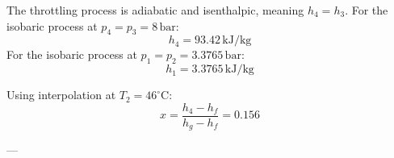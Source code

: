The throttling process is adiabatic and isenthalpic, meaning \( h_4 = h_3 \).  
For the isobaric process at \( p_4 = p_3 = 8 \, \text{bar} \):  
\[
h_4 = 93.42 \, \text{kJ/kg}
\]  
For the isobaric process at \( p_1 = p_2 = 3.3765 \, \text{bar} \):  
\[
h_1 = 3.3765 \, \text{kJ/kg}
\]  

Using interpolation at \( T_2 = 46^\circ \text{C} \):  
\[
x = \frac{h_4 - h_f}{h_g - h_f} = 0.156
\]

---